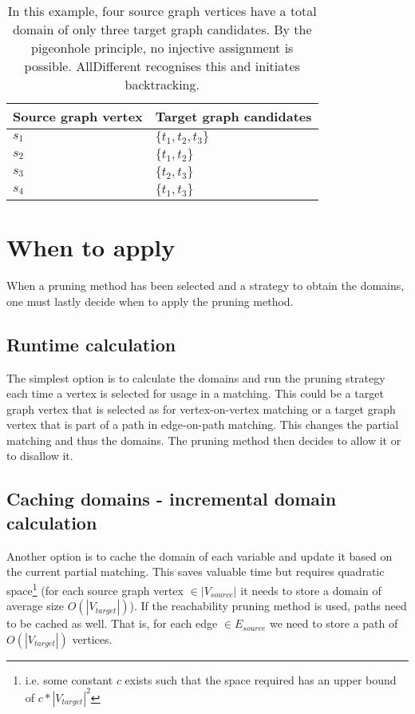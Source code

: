 \begin{table}
\centering
\begin{tabular}{|l|l|}
\hline
\textbf{Source graph vertex} & \textbf{Target graph candidates} \\ \hline
$s_1$                          & $\{t_1, t_2, t_3\}$      \\ \hline
$s_2$                          & $\{t_1, t_2\}$              \\ \hline
$s_3$                          & $\{t_2, t_3\}$              \\ \hline
$s_4$                          & $\{t_1, t_3\}$             \\ \hline
\end{tabular}
\caption{In this example, four source graph vertices have a total domain of only three target graph candidates. By the pigeonhole principle, no injective assignment is possible. AllDifferent recognises this and initiates backtracking.}
\label{tab:alldifferent}
\end{table}




\section{When to apply}
When a pruning method has been selected and a strategy to obtain the domains, one must lastly decide when to apply the pruning method.
\subsection{Runtime calculation}
The simplest option is to calculate the domains and run the pruning strategy each time a vertex is selected for usage in a matching. This could be a target graph vertex that is selected as for vertex-on-vertex matching or a target graph vertex that is part of a path in edge-on-path matching. This changes the partial matching and thus the domains. The pruning method then decides to allow it or to disallow it.
\subsection{Caching domains - incremental domain calculation}
Another option is to cache the domain of each variable and update it based on the current partial matching. This saves valuable time but requires quadratic space\footnote{i.e. some constant $c$ exists such that the space required has an upper bound of $c * |V_{target}|^2$} (for each source graph vertex $\in |V_{source}|$ it needs to store a domain of average size $O(|V_{target}|)$). If the reachability pruning method is used, paths need to be cached as well. That is, for each edge $\in E_{source}$ we need to store a path of $O(|V_{target}|)$ vertices.
